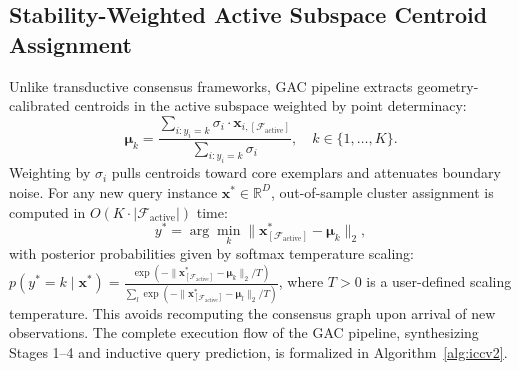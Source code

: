 \documentclass[pdflatex,sn-mathphys-num]{sn-jnl}
\theoremstyle{thmstyleone}
\theoremstyle{thmstyletwo}
\theoremstyle{thmstylethree}
\begin{document}
\subsection{Stability-Weighted Active Subspace Centroid Assignment}\label{sec:centroid}
Unlike transductive consensus frameworks, GAC pipeline extracts geometry-calibrated centroids in the active subspace weighted by point determinacy:
\begin{equation}\label{eq:centroid_proj}
 \boldsymbol{\mu}_k = \frac{\sum_{i: y_i = k} \sigma_i \cdot \mathbf{x}_{i, [\mathcal{F}_{\text{active}}]}}{\sum_{i: y_i = k} \sigma_i}, \quad k \in \{1,\dots,K\}.
\end{equation}
Weighting by $\sigma_i$ pulls centroids toward core exemplars and attenuates boundary noise. For any new query instance $\mathbf{x}^* \in \mathbb{R}^D$, out-of-sample cluster assignment is computed in $O(K \cdot |\mathcal{F}_{\text{active}}|)$ time:
\begin{equation}\label{eq:query_assign}
 y^* = \arg\min_k \|\mathbf{x}^*_{[\mathcal{F}_{\text{active}}]} - \boldsymbol{\mu}_k\|_2,
\end{equation}
with posterior probabilities given by softmax temperature scaling: $p(y^*=k \mid \mathbf{x}^*) = \frac{\exp(-\|\mathbf{x}^*_{[\mathcal{F}_{\text{active}}]} - \boldsymbol{\mu}_k\|_2 / T)}{\sum_l \exp(-\|\mathbf{x}^*_{[\mathcal{F}_{\text{active}}]} - \boldsymbol{\mu}_l\|_2 / T)}$, where $T > 0$ is a user-defined scaling temperature. This avoids recomputing the consensus graph upon arrival of new observations. The complete execution flow of the GAC pipeline, synthesizing Stages 1--4 and inductive query prediction, is formalized in Algorithm~\ref{alg:iccv2}.
\end{document}

